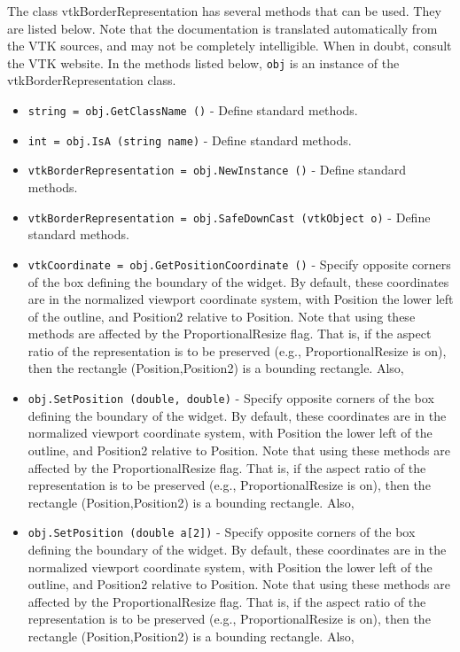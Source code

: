 The class vtkBorderRepresentation has several methods that can be used.
  They are listed below.
Note that the documentation is translated automatically from the VTK sources,
and may not be completely intelligible.  When in doubt, consult the VTK website.
In the methods listed below, \verb|obj| is an instance of the vtkBorderRepresentation class.
\begin{itemize}
\item  \verb|string = obj.GetClassName ()| -  Define standard methods.

\item  \verb|int = obj.IsA (string name)| -  Define standard methods.

\item  \verb|vtkBorderRepresentation = obj.NewInstance ()| -  Define standard methods.

\item  \verb|vtkBorderRepresentation = obj.SafeDownCast (vtkObject o)| -  Define standard methods.

\item  \verb|vtkCoordinate = obj.GetPositionCoordinate ()| -  Specify opposite corners of the box defining the boundary of the
 widget. By default, these coordinates are in the normalized viewport
 coordinate system, with Position the lower left of the outline, and
 Position2 relative to Position. Note that using these methods are
 affected by the ProportionalResize flag. That is, if the aspect ratio of
 the representation is to be preserved (e.g., ProportionalResize is on),
 then the rectangle (Position,Position2) is a bounding rectangle. Also,

\item  \verb|obj.SetPosition (double, double)| -  Specify opposite corners of the box defining the boundary of the
 widget. By default, these coordinates are in the normalized viewport
 coordinate system, with Position the lower left of the outline, and
 Position2 relative to Position. Note that using these methods are
 affected by the ProportionalResize flag. That is, if the aspect ratio of
 the representation is to be preserved (e.g., ProportionalResize is on),
 then the rectangle (Position,Position2) is a bounding rectangle. Also,

\item  \verb|obj.SetPosition (double a[2])| -  Specify opposite corners of the box defining the boundary of the
 widget. By default, these coordinates are in the normalized viewport
 coordinate system, with Position the lower left of the outline, and
 Position2 relative to Position. Note that using these methods are
 affected by the ProportionalResize flag. That is, if the aspect ratio of
 the representation is to be preserved (e.g., ProportionalResize is on),
 then the rectangle (Position,Position2) is a bounding rectangle. Also,


\end{itemize}
